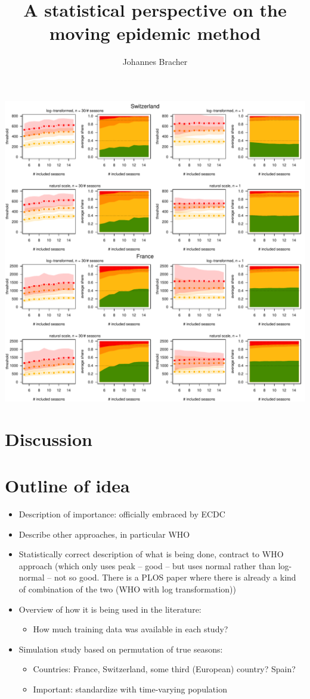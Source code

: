 \documentclass{article}
\begin{document}
\includegraphics[page=2]{figure/plot_results.pdf}


\section{Discussion}

\section*{Outline of idea}

\begin{itemize}
\item Description of importance: officially embraced by ECDC
\item Describe other approaches, in particular WHO
\item Statistically correct description of what is being done, contract to WHO approach (which only uses peak -- good -- but uses normal rather than log-normal -- not so good. There is a PLOS paper where there is already a kind of combination of the two (WHO with log transformation))
\item Overview of how it is being used in the literature:
\begin{itemize}
\item How much training data was available in each study?
\end{itemize}
\item Simulation study based on permutation of true seasons:
\begin{itemize}
\item Countries: France, Switzerland, some third (European) country? Spain?
\item Important: standardize with time-varying population
\end{itemize}
\end{itemize}

\title{A statistical perspective on the moving epidemic method }
\author{Johannes Bracher}
\maketitle





\end{document}
